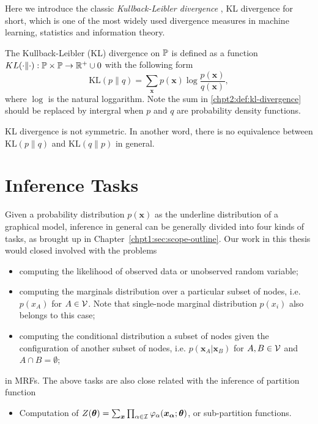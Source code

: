 Here we introduce the classic \textit{Kullback-Leibler divergence} \cite{kullback1959, kullback1951}, KL divergence for short, which is one of the most widely used divergence measures in machine learning, statistics and information theory.
\begin{definition}
  The Kullback-Leibler (KL) divergence on $\mathbb{P}$ is defined as a function $KL(\cdot \| \cdot): \mathbb{P} \times \mathbb{P} \rightarrow \mathbb{R}^{+} \cup {0}$ with the following form
  \begin{equation}\label{chpt2:def:kl-divergence}
    \mathrm{KL}(p\|q) = \sum_{\bm{x}}p(\bm{x}) \log{\frac{p(\bm{x})}{q(\bm{x})}},
  \end{equation}
  where $\log$ is the natural loggarithm. Note the sum in \ref{chpt2:def:kl-divergence} should be replaced by intergral when $p$ and $q$ are probability density functions.
\end{definition}


KL divergence is not symmetric. In another word, there is no equivalence between $\mathrm{KL}(p\|q)$ and $\mathrm{KL}(q\|p)$ in general. 



\section{Inference Tasks}
\label{sec:background-graphial-reppresentation}

Given a probability distribution $p(\bm{x})$ as the underline distribution of a graphical model, inference in general can be generally divided into four kinds of tasks, as brought up in Chapter~\ref{chpt1:sec:scope-outline}. Our work in this thesis would closed involved with the problems
\begin{itemize}
\item computing the likelihood of observed data or unobserved random variable;
\item computing the marginals distribution over a particular subset of nodes, i.e. $p(x_A)$ for $A \in \mathcal{V}$. Note that single-node marginal distribution $p(x_i)$ also belongs to this case;
\item computing the conditional distribution a subset of nodes given the configuration of another subset of nodes, i.e. $p(\bm{x}_A| \bm{x}_B)$ for $A, B \in \mathcal{V}$ and $A \cap B = \emptyset$;
\end{itemize}
in MRFs. The above tasks are also close related with the inference of partition function
\begin{itemize}
\item Computation of $Z(\bm{\theta}) = \sum_{\bm{x}} \prod_{\alpha \in \mathcal{I}} \varphi_{\alpha}(\bm{x_{\alpha}};\bm{\theta})$, or sub-partition functions.
\end{itemize}



